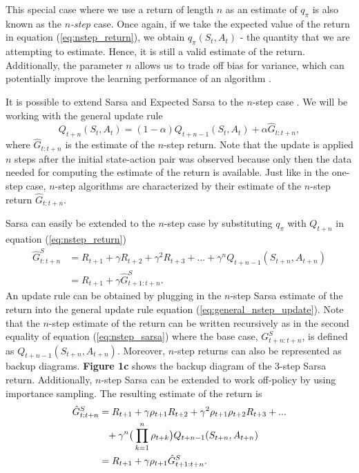 This special case where we use a return of length $n$ as an estimate of $q_\pi$ is also known as the $n$\textit{-step} case.
Once again, if we take the expected value of the return in equation (\ref{eq:nstep_return}), we obtain $q_\pi(S_t, A_t)$ - the quantity that we are attempting to estimate.
Hence, it is still a valid estimate of the return.
Additionally, the parameter $n$ allows us to trade off bias for variance, which can potentially improve the learning performance of an algorithm \parencite{Kearns:2000:BEB:648299.755183}.

It is possible to extend Sarsa and Expected Sarsa to the $n$-step case \parencite{rummery1995,precup2000,sutton2018}.
We will be working with the general update rule
\begin{equation}
\label{eq:general_nstep_update}
Q_{t+n}(S_t, A_t) = (1-\alpha)Q_{t+n-1}(S_t,A_t) + \alpha \hat{G}_{t:t+n},
\end{equation}
where $\hat{G}_{t:t+n}$ is the estimate of the $n$-step return.
Note that the update is applied $n$ steps after the initial state-action pair was observed because only then the data needed for computing the estimate of the return is available.
Just like in the one-step case, $n$-step algorithms are characterized by their estimate of the $n$-step return $\hat{G}_{t:t+n}$.

Sarsa can easily be extended to the $n$-step case by substituting $q_\pi$ with $Q_{t+n}$ in equation (\ref{eq:nstep_return})
\begin{align}
\label{eq:nstep_sarsa}
\hat{G}^S_{t:t+n} &= R_{t+1} + \gamma R_{t+2} + \gamma^2 R_{t+3} +  ... + \gamma^n Q_{t+n-1}(S_{t+n}, A_{t+n}) 
	\nonumber \\
%
&= R_{t+1} + \gamma \hat{G}^S_{t+1:t+n}.
\end{align}
An update rule can be obtained by plugging in the $n$-step Sarsa estimate of the return into the general update rule equation (\ref{eq:general_nstep_update}).
Note that the $n$-step estimate of the return can be written recursively as in the second equality of equation (\ref{eq:nstep_sarsa}) where the base case, $G^S_{t+n:t+n}$, is defined as $Q_{t+n-1}(S_{t+n}, A_{t+n})$.
Moreover, $n$-step returns can also be represented as backup diagrams.
\textbf{Figure 1c} shows the backup diagram of the $3$-step Sarsa return. 
Additionally, $n$-step Sarsa can be extended to work off-policy by using importance sampling.
The resulting estimate of the return is
\begin{align}
\label{eq:offpolicy_nstep_sarsa}
\hat{G}^S_{t:t+n} &= R_{t+1} + \gamma \rho_{t+1} R_{t+2} + \gamma^2 \rho_{t+1} \rho_{t+2} R_{t+3} +  ... 
	\nonumber \\
&\hphantom{=}
	+ \gamma^n \big(\prod^n_{k=1} \rho_{t+k} \big) Q_{t+n-1}(S_{t+n}, A_{t+n}) 
	\nonumber \\
%
&= R_{t+1} + \gamma \rho_{t+1} \hat{G}^S_{t+1:t+n}.
\end{align}

